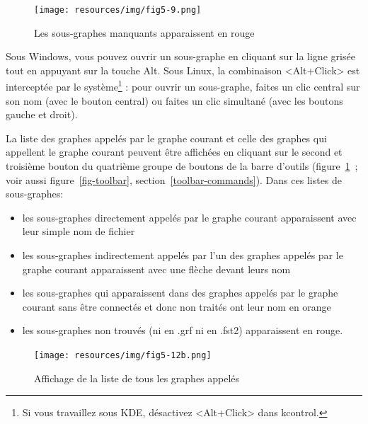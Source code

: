 
\begin{figure}[!ht]
\begin{center}
\texttt{[image: resources/img/fig5-9.png]}
\caption{Les sous-graphes manquants apparaissent en rouge}
\end{center}
\end{figure}


\bigskip
\noindent Sous Windows, vous
pouvez ouvrir un sous-graphe en cliquant sur la ligne grisée tout en appuyant sur la touche Alt.
Sous Linux, la combinaison <Alt+Click> est interceptée par le système\footnote{Si vous travaillez
sous KDE, désactivez <Alt+Click> dans kcontrol.} :
pour ouvrir un sous-graphe, faites un clic central sur son nom (avec le bouton central) ou faites un clic simultané (avec les boutons gauche
et droit).


\bigskip
\noindent La liste des graphes appelés par le graphe courant et celle des graphes qui appellent le
graphe courant peuvent être affichées en cliquant sur le second et troisième bouton du quatrième
groupe de boutons de la barre d'outils (figure~\ref{list-called-graphs}~; voir aussi
figure~\ref{fig-toolbar}, section~\ref{toolbar-commands}).
Dans ces listes de sous-graphes:
\begin{itemize}
\item les sous-graphes directement appelés par le graphe courant apparaissent avec leur simple nom
	de fichier
\item les sous-graphes indirectement appelés par l'un des graphes appelés par le graphe courant
	apparaissent avec une flèche devant leurs nom
\item les sous-graphes qui apparaissent dans des graphes appelés par le graphe courant sans être
	connectés et donc non traités  ont leur nom en orange
\item les sous-graphes non trouvés (ni en .grf ni en .fst2) apparaissent en rouge.
\end{itemize}

\begin{figure}[!ht]
\begin{center}
\texttt{[image: resources/img/fig5-12b.png]}
\caption{Affichage de la liste de tous les graphes appelés\label{list-called-graphs}}
\end{center}
\end{figure}


